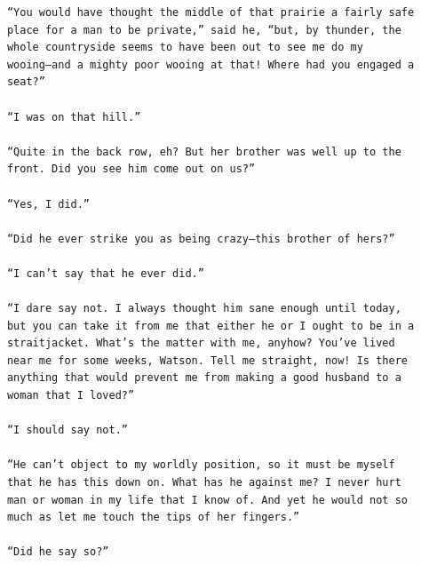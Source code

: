 \documentclass{article}
\begin{document}
\begin{verbatim}
      “You would have thought the middle of that prairie a fairly safe
      place for a man to be private,” said he, “but, by thunder, the
      whole countryside seems to have been out to see me do my
      wooing—and a mighty poor wooing at that! Where had you engaged a
      seat?”

      “I was on that hill.”

      “Quite in the back row, eh? But her brother was well up to the
      front. Did you see him come out on us?”

      “Yes, I did.”

      “Did he ever strike you as being crazy—this brother of hers?”

      “I can’t say that he ever did.”

      “I dare say not. I always thought him sane enough until today,
      but you can take it from me that either he or I ought to be in a
      straitjacket. What’s the matter with me, anyhow? You’ve lived
      near me for some weeks, Watson. Tell me straight, now! Is there
      anything that would prevent me from making a good husband to a
      woman that I loved?”

      “I should say not.”

      “He can’t object to my worldly position, so it must be myself
      that he has this down on. What has he against me? I never hurt
      man or woman in my life that I know of. And yet he would not so
      much as let me touch the tips of her fingers.”

      “Did he say so?”


\end{verbatim}
\end{document}
